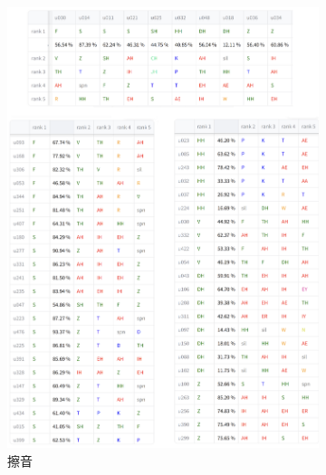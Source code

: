 {{\begin{figure}
\begin{subfigure}{\textwidth}
                 \includegraphics[width=\tempwidth]{chapters/fri_phn.png}
                 \caption{擦音}
                 \label{fig:hub-u050-ap0500-friobs}
             \end{subfigure}
             \vfill
             \begin{subfigure}{\textwidth}
                 \centering

\end{subfigure}
\end{figure}}}
